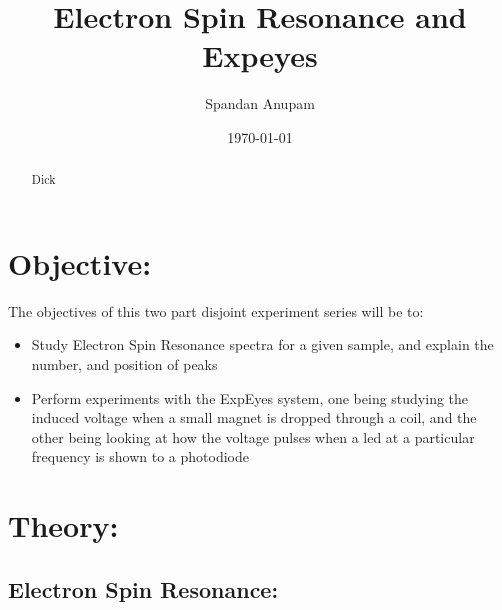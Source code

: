 \documentclass{../_layouts/ieeeconf}
\begin{document}
\title{Electron Spin Resonance and Expeyes}

\author{Spandan Anupam}

\date{\today}
\maketitle

\begin{abstract}
Dick

\end{abstract}
\section{Objective:}
The objectives of this two part disjoint experiment series will be to:

\begin{itemize}
\tightlist
\item
Study Electron Spin Resonance spectra for a given sample, and explain the number, and position of peaks
\item
Perform experiments with the ExpEyes system, one being studying the induced voltage when a small magnet is dropped through a coil, and the other being looking at how the voltage pulses when a led at a particular frequency is shown to a photodiode
\end{itemize}
\section{Theory:}
\subsection{Electron Spin Resonance:}
\end{document}

